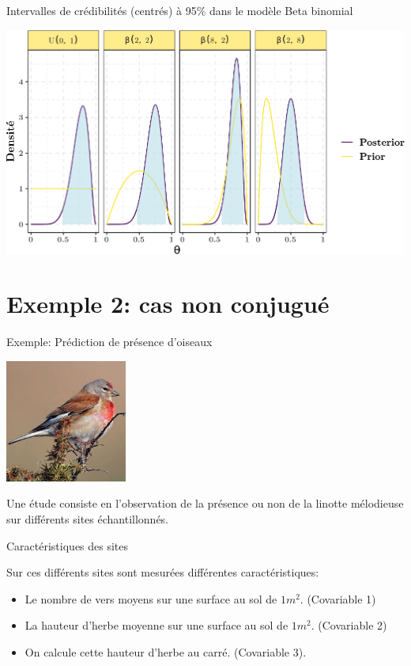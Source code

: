 \documentclass[9pt,ignorenonframetext,]{beamer}
\providecommand{\tightlist}{%
  \setlength{\itemsep}{0pt}\setlength{\parskip}{0pt}}
\begin{document}
\begin{frame}{Intervalles de crédibilités (centrés) à 95\% dans le
modèle Beta binomial}
\protect\hypertarget{intervalles-de-cruxe9dibilituxe9s-centruxe9s-uxe0-95-dans-le-moduxe8le-beta-binomial}{}

\includegraphics{diapos_inference_bayesienne_files/figure-beamer/intervalle_credi-1.pdf}

\end{frame}

\hypertarget{exemple-2-cas-non-conjuguuxe9}{%
\section{Exemple 2: cas non
conjugué}\label{exemple-2-cas-non-conjuguuxe9}}

\begin{frame}{Exemple: Prédiction de présence d'oiseaux}
\protect\hypertarget{exemple-pruxe9diction-de-pruxe9sence-doiseaux}{}

\includegraphics[width = 0.3\textwidth]{figures/linotte.jpeg}

Une étude consiste en l'observation de la présence ou non de la linotte
mélodieuse sur différents sites échantillonnés.

\begin{block}{Caractéristiques des sites}

Sur ces différents sites sont mesurées différentes caractéristiques:

\begin{itemize}
\tightlist
\item
  Le nombre de vers moyens sur une surface au sol de \(1m^2\).
  (Covariable 1)
\item
  La hauteur d'herbe moyenne sur une surface au sol de \(1m^2\).
  (Covariable 2)
\item
  On calcule cette hauteur d'herbe au carré. (Covariable 3).
\end{itemize}

\end{block}

\end{frame}
\end{document}
